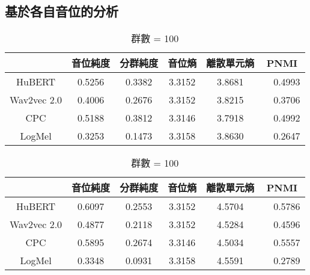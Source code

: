 \subsection{基於各自音位的分析}

        \begin{table}[!htbp]
            \centering
            \begin{subtable}[t]{\textwidth}
                \centering
                \begin{tabular}{|c|c|c|c|c|c|} \hline 
                                & 音位純度 & 分群純度 & 音位熵 & 離散單元熵 &    PNMI \\ \hline 
                    HuBERT      &   0.5256 &   0.3382 & 3.3152 &     3.8681 &　0.4993 \\ \hline    %
                    Wav2vec 2.0 &   0.4006 &   0.2676 & 3.3152 &     3.8215 &　0.3706 \\ \hline    %
                    CPC         &   0.5188 &   0.3812 & 3.3146 &     3.7918 &　0.4992 \\ \hline    %
                    LogMel      &   0.3253 &   0.1473 & 3.3158 &     3.8630 &　0.2647 \\ \hline    %
                \end{tabular}
                \caption{群數 = 50}
                \label{tab:ch3-clu050}
            \end{subtable}        

            \vspace{0.5cm}        

            \begin{subtable}[t]{\textwidth}
                \centering
                \begin{tabular}{|c|c|c|c|c|c|} \hline 
                                & 音位純度 & 分群純度 & 音位熵 & 離散單元熵 &    PNMI \\ \hline 
                    HuBERT      &   0.6097 &   0.2553 & 3.3152 &     4.5704 &　0.5786 \\ \hline    %
                    Wav2vec 2.0 &   0.4877 &   0.2118 & 3.3152 &     4.5284 &　0.4596 \\ \hline    %
                    CPC         &   0.5895 &   0.2674 & 3.3146 &     4.5034 &　0.5557 \\ \hline    %
                    LogMel      &   0.3348 &   0.0931 & 3.3158 &     4.5591 &　0.2789 \\ \hline    %
                \end{tabular}
                \caption{群數 = 100}
                \label{tab:ch3-clu100}
            \end{subtable}        


\end{table}
